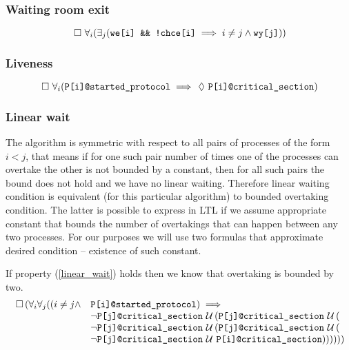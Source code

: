 \subsubsection*{Waiting room exit}

\begin{equation}
\always \forall_i (\exists_j (\verb+we[i] && !chce[i]+ \implies i \neq j \land \verb+wy[j]+)) \label{anteroom_exit}
\end{equation}

\subsubsection*{Liveness}

\begin{equation}
\always \forall_i (\verb+P[i]@started_protocol+ \implies \eventually \verb+P[i]@critical_section+) \label{liveness}
\end{equation}

\subsubsection*{Linear wait}

The algorithm is symmetric with respect to all pairs of processes of the form $i < j$, that means if for one such pair number of times one of the processes can overtake the other is not bounded by a constant, then for all such pairs the bound does not hold and we have no linear waiting.
Therefore linear waiting condition is equivalent (for this particular algorithm) to bounded overtaking condition.
The latter is possible to express in LTL if we assume appropriate constant that bounds the number of overtakings that can happen between any two processes.
For our purposes we will use two formulas that approximate desired condition -- existence of such constant.

If property (\ref{linear_wait}) holds then we know that overtaking is bounded by two.
\begin{equation}
\begin{array}{rl}
\always (\forall_i \forall_j ((i \neq j \land & \verb+P[i]@started_protocol+) \implies \\
 & \neg \verb+P[j]@critical_section+ \until (\verb+P[j]@critical_section+ \until ( \\
 & \neg \verb+P[j]@critical_section+ \until (\verb+P[j]@critical_section+ \until ( \\
 & \neg \verb+P[j]@critical_section+ \until \verb+P[i]@critical_section+))))))
\end{array}
\label{linear_wait}
\end{equation}

